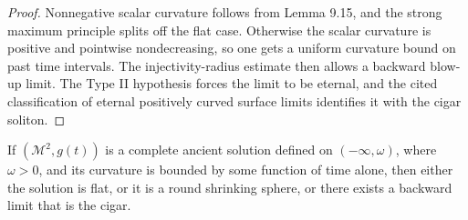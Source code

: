\begin{proof}
\sketch Nonnegative scalar curvature follows from Lemma 9.15, and the strong maximum principle splits off the flat case. Otherwise the scalar curvature is positive and pointwise nondecreasing, so one gets a uniform curvature bound on past time intervals. The injectivity-radius estimate then allows a backward blow-up limit. The Type II hypothesis forces the limit to be eternal, and the cited classification of eternal positively curved surface limits identifies it with the cigar soliton.
\end{proof}

\begin{corollary}
\label{ch09-cor-ancient-surface-classification}
If \((\mathcal M^2,g(t))\) is a complete ancient solution defined on \((-\infty,\omega)\), where \(\omega>0\), and its curvature is bounded by some function of time alone, then either the solution is flat, or it is a round shrinking sphere, or there exists a backward limit that is the cigar.
\end{corollary}
